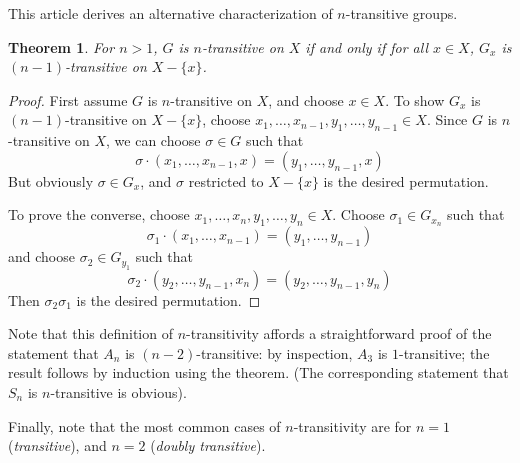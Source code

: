 \documentclass[12pt]{article}
\newtheorem*{thm}{Theorem}
\begin{document}
This article derives an alternative characterization of $n$-transitive groups.

\begin{thm} For $n>1$, $G$ is $n$-transitive on $X$ if and only if for all $x\in X$, $G_x$ is $(n-1)$-transitive on $X-\{x\}$.
\end{thm}
\begin{proof}
First assume $G$ is $n$-transitive on $X$, and choose $x\in X$. To show $G_x$ is $(n-1)$-transitive on $X-\{x\}$, choose $x_1,\ldots,x_{n-1},y_1,\ldots,y_{n-1}\in X$. Since $G$ is $n$-transitive on $X$, we can choose $\sigma\in G$ such that
\[\sigma\cdot(x_1,\ldots,x_{n-1},x)=(y_1,\ldots,y_{n-1},x)\]
But obviously $\sigma\in G_x$, and $\sigma$ restricted to $X-\{x\}$ is the desired permutation.

To prove the converse, choose $x_1,\ldots,x_n,y_1,\ldots,y_n\in X$. Choose $\sigma_1\in G_{x_n}$ such that
\[\sigma_1\cdot(x_1,\ldots,x_{n-1})=(y_1,\ldots,y_{n-1})\]
and choose $\sigma_2\in G_{y_1}$ such that
\[\sigma_2\cdot(y_2,\ldots,y_{n-1},x_n)=(y_2,\ldots,y_{n-1},y_n)\]
Then $\sigma_2\sigma_1$ is the desired permutation.
\end{proof}

Note that this definition of $n$-transitivity affords a straightforward proof of the statement that $A_n$ is $(n-2)$-transitive: by inspection, $A_3$ is $1$-transitive; the result follows by induction using the theorem. (The corresponding statement that $S_n$ is $n$-transitive is obvious).

Finally, note that the most common cases of $n$-transitivity are for $n=1$ (\emph{transitive}), and $n=2$ (\emph{doubly transitive}).
\end{document}
